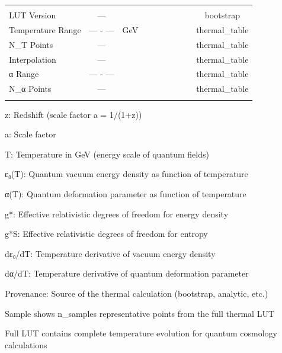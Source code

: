 \begin{table}[htbp]
\begin{tabular}{lccccccccc}
 &  &  &  &  &  &  &  &  &  \\
LUT Version & — &  &  &  &  &  &  &  & bootstrap \\
Temperature Range & — - — & GeV &  &  &  &  &  &  & thermal_table \\
N_T Points & — &  &  &  &  &  &  &  & thermal_table \\
Interpolation & — &  &  &  &  &  &  &  & thermal_table \\
α Range & — - — &  &  &  &  &  &  &  & thermal_table \\
N_α Points & — &  &  &  &  &  &  &  & thermal_table \\
 &  &  &  &  &  &  &  &  &  \\
\hline
\end{tabular}
\begin{tablenotes}
\small
\item[1] z: Redshift (scale factor a = 1/(1+z))
\item[2] a: Scale factor
\item[3] T: Temperature in GeV (energy scale of quantum fields)
\item[4] ε₀(T): Quantum vacuum energy density as function of temperature
\item[5] α(T): Quantum deformation parameter as function of temperature
\item[6] g*: Effective relativistic degrees of freedom for energy density
\item[7] g*S: Effective relativistic degrees of freedom for entropy
\item[8] dε₀/dT: Temperature derivative of vacuum energy density
\item[9] dα/dT: Temperature derivative of quantum deformation parameter
\item[10] Provenance: Source of the thermal calculation (bootstrap, analytic, etc.)
\item[11] Sample shows {n_samples} representative points from the full thermal LUT
\item[12] Full LUT contains complete temperature evolution for quantum cosmology calculations
\end{tablenotes}
\end{table}
